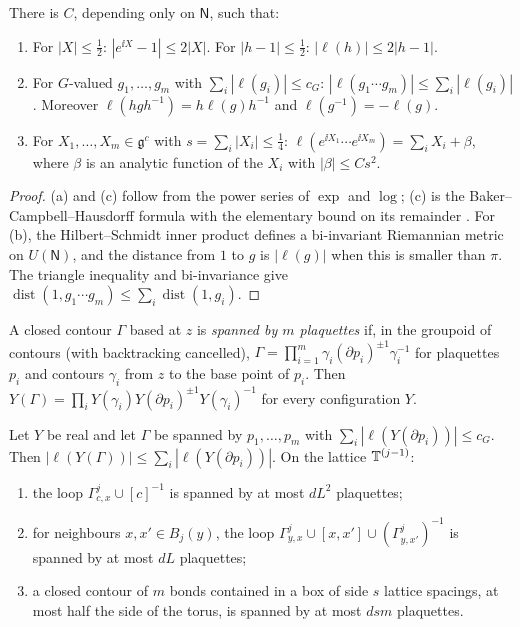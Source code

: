 \begin{lemma}\label{lem:log-estimates}
There is $C$, depending only on $\mathsf N$, such that:
\begin{enumerate}[label=(\alph*)]
\item For $|X|\le\frac12$: $|e^{\ii X}-1|\le2|X|$. For $|h-1|\le\frac12$: $|\ell(h)|\le2|h-1|$.
\item For $G$-valued $g_1,\dots,g_m$ with $\sum_i|\ell(g_i)|\le c_G$: $|\ell(g_1\cdots g_m)|\le\sum_i|\ell(g_i)|$. Moreover $\ell(hgh^{-1})=h\ell(g)h^{-1}$ and $\ell(g^{-1})=-\ell(g)$.
\item For $X_1,\dots,X_m\in\mathfrak g^c$ with $s=\sum_i|X_i|\le\frac14$: $\ell(e^{\ii X_1}\cdots e^{\ii X_m})=\sum_iX_i+\beta$, where $\beta$ is an analytic function of the $X_i$ with $|\beta|\le Cs^2$.
\end{enumerate}
\end{lemma}

\begin{proof}
(a) and (c) follow from the power series of $\exp$ and $\log$; (c) is the Baker--Campbell--Hausdorff formula with the elementary bound on its remainder \cite[(30)]{BalAvg}. For (b), the Hilbert--Schmidt inner product defines a bi-invariant Riemannian metric on $U(\mathsf N)$, and the distance from $1$ to $g$ is $|\ell(g)|$ when this is smaller than $\pi$. The triangle inequality and bi-invariance give $\operatorname{dist}(1,g_1\cdots g_m)\le\sum_i\operatorname{dist}(1,g_i)$.
\end{proof}

A closed contour $\Gamma$ based at $z$ is \emph{spanned by $m$ plaquettes} if, in the groupoid of contours (with backtracking cancelled), $\Gamma=\prod_{i=1}^m\gamma_i(\partial p_i)^{\pm1}\gamma_i^{-1}$ for plaquettes $p_i$ and contours $\gamma_i$ from $z$ to the base point of $p_i$. Then $Y(\Gamma)=\prod_iY(\gamma_i)Y(\partial p_i)^{\pm1}Y(\gamma_i)^{-1}$ for every configuration $Y$.

\begin{lemma}\label{lem:stokes}
Let $Y$ be real and let $\Gamma$ be spanned by $p_1,\dots,p_m$ with $\sum_i|\ell(Y(\partial p_i))|\le c_G$. Then $|\ell(Y(\Gamma))|\le\sum_i|\ell(Y(\partial p_i))|$. On the lattice $\mathbb T^{(j-1)}$:
\begin{enumerate}[label=(\roman*)]
\item the loop $\Gamma^j_{c,x}\cup[c]^{-1}$ is spanned by at most $dL^2$ plaquettes;
\item for neighbours $x,x'\in B_j(y)$, the loop $\Gamma^j_{y,x}\cup[x,x']\cup(\Gamma^j_{y,x'})^{-1}$ is spanned by at most $dL$ plaquettes;
\item a closed contour of $m$ bonds contained in a box of side $s$ lattice spacings, at most half the side of the torus, is spanned by at most $dsm$ plaquettes.
\end{enumerate}
\end{lemma}

